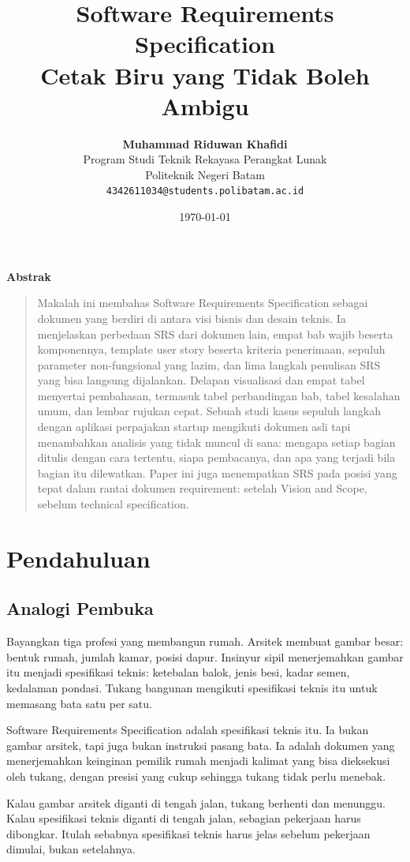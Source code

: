 \documentclass[11pt,a4paper]{article}
\title{\vspace{-1.5cm}\textbf{\sffamily\LARGE Software Requirements Specification\\ Cetak Biru yang Tidak Boleh Ambigu}}
\author{
	\textbf{Muhammad Riduwan Khafidi} \\
	\small Program Studi Teknik Rekayasa Perangkat Lunak \\
	\small Politeknik Negeri Batam \\
	\small \texttt{4342611034@students.polibatam.ac.id}
}
\date{\small\today}
\renewenvironment{abstract}
{\small
	\begin{center}\textbf{\sffamily Abstrak}\end{center}
	\begin{quote}}
	{\end{quote}}
\begin{document}
\maketitle
\thispagestyle{empty}

\begin{abstract}
	Makalah ini membahas Software Requirements Specification sebagai dokumen yang berdiri di antara visi bisnis dan desain teknis. Ia menjelaskan perbedaan SRS dari dokumen lain, empat bab wajib beserta komponennya, template user story beserta kriteria penerimaan, sepuluh parameter non-fungsional yang lazim, dan lima langkah penulisan SRS yang bisa langsung dijalankan. Delapan visualisasi dan empat tabel menyertai pembahasan, termasuk tabel perbandingan bab, tabel kesalahan umum, dan lembar rujukan cepat. Sebuah studi kasus sepuluh langkah dengan aplikasi perpajakan startup mengikuti dokumen asli tapi menambahkan analisis yang tidak muncul di sana: mengapa setiap bagian ditulis dengan cara tertentu, siapa pembacanya, dan apa yang terjadi bila bagian itu dilewatkan. Paper ini juga menempatkan SRS pada posisi yang tepat dalam rantai dokumen requirement: setelah Vision and Scope, sebelum technical specification.
\end{abstract}

\section{Pendahuluan}

\subsection{Analogi Pembuka}

Bayangkan tiga profesi yang membangun rumah. Arsitek membuat gambar besar: bentuk rumah, jumlah kamar, posisi dapur. Insinyur sipil menerjemahkan gambar itu menjadi spesifikasi teknis: ketebalan balok, jenis besi, kadar semen, kedalaman pondasi. Tukang bangunan mengikuti spesifikasi teknis itu untuk memasang bata satu per satu.

Software Requirements Specification adalah spesifikasi teknis itu. Ia bukan gambar arsitek, tapi juga bukan instruksi pasang bata. Ia adalah dokumen yang menerjemahkan keinginan pemilik rumah menjadi kalimat yang bisa dieksekusi oleh tukang, dengan presisi yang cukup sehingga tukang tidak perlu menebak.

Kalau gambar arsitek diganti di tengah jalan, tukang berhenti dan menunggu. Kalau spesifikasi teknis diganti di tengah jalan, sebagian pekerjaan harus dibongkar. Itulah sebabnya spesifikasi teknis harus jelas sebelum pekerjaan dimulai, bukan setelahnya.
\end{document}
